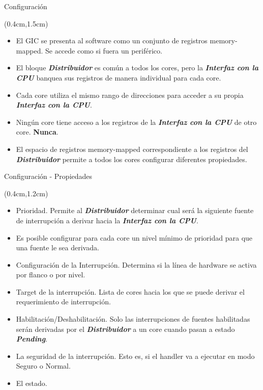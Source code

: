 \documentclass[table,x11names,aspectratio=169]{beamer}
\begin{document}
\begin{frame}[t]{Configuración}
 \begin{textblock*}{\textwidth}(0.4cm,1.5cm)
  \begin{itemize}[<+(1)->]\justifying \parskip 0.2cm
   \item El GIC se presenta al software como un conjunto de registros memory-mapped. Se accede como si fuera un periférico.
   \item El bloque \textbf{\textit{Distribuidor}} es común a todos los cores, pero la \textit{\textbf{Interfaz con la CPU}} banquea sus registros de manera individual para cada core. 
   \item Cada core utiliza el mismo rango de direcciones para acceder a su propia \textbf{\textit{Interfaz con la CPU}}.
   \item Ningún core tiene acceso a los registros de la \textbf{\textit{Interfaz con la CPU}} de otro core. \textbf{Nunca}.
   \item El espacio de registros memory-mapped correspondiente a los registros del \textbf{\textit{Distribuidor}} permite a  todos los cores configurar diferentes propiedades.
  \end{itemize}
 \end{textblock*}
\end{frame}

\begin{frame}[t]{Configuración - Propiedades}
 \begin{textblock*}{\textwidth}(0.4cm,1.2cm)
  \begin{itemize}[<+(1)->]\justifying%
   \item Prioridad. Permite al \textbf{\textit{Distribuidor}} determinar cual será la siguiente fuente de interrupción a derivar hacia la \textbf{\textit{Interfaz con la CPU}}.
   \item Es posible configurar para cada core un nivel mínimo de prioridad para que una fuente le sea derivada.
   \item Configuración de la Interrupción. Determina si la línea de hardware se activa por flanco o por nivel.
   \item Target de la interrupción. Lista de cores hacia los que se puede derivar el requerimiento de interrupción.
   \item Habilitación/Deshabilitación. Solo las interrupciones de fuentes habilitadas serán derivadas por el \textbf{\textit{Distribuidor}} a un core cuando pasan a estado \textbf{\textit{\color{Blue2}Pending}}. 
   \item La seguridad de la interrupción. Esto es, si el handler va a ejecutar en modo Seguro o Normal.
   \item El estado.
  \end{itemize}
 \end{textblock*}
\end{frame}
\end{document}

